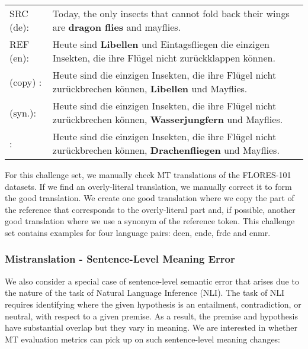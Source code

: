 \documentclass[11pt]{article}
\newcommand{\cmark}{\textcolor{darkpastelgreen}{\ding{51}}}\newcommand{\xmark}{\textcolor{darkpastelred}{\ding{55}}}
\begin{document}
\begin{small}
\vspace{0.5cm}
\setlength{\extrarowheight}{0.1cm}
\begin{tabularx}{0.95\columnwidth}{lX}
     SRC (de): & Today, the only insects that cannot fold back their wings are \textbf{dragon flies} and mayflies. \\
     REF (en): & Heute sind \textbf{Libellen} und Eintagsfliegen die einzigen Insekten, die ihre Flügel nicht zurückklappen können. \\
     \cmark{} (copy) : & Heute sind die einzigen Insekten, die ihre Flügel nicht zurückbrechen können, \textbf{Libellen} und Mayflies. \\
     \cmark{} (syn.): & Heute sind die einzigen Insekten, die ihre Flügel nicht zurückbrechen können, \textbf{Wasserjungfern} und Mayflies. \\
     \xmark: & Heute sind die einzigen Insekten, die ihre Flügel nicht zurückbrechen können, \textbf{Drachenfliegen} und Mayflies. \vspace{0.35cm}
\end{tabularx}
\end{small}

For this challenge set, we manually check MT translations of the FLORES-101 datasets. If we find an overly-literal translation, we manually correct it to form the good translation. We create one good translation where we copy the part of the reference that corresponds to the overly-literal part and, if possible, another good translation where we use a synonym of the reference token. This challenge set contains examples for four language pairs: deen, ende, frde and enmr.



\subsubsection{Mistranslation - Sentence-Level Meaning Error}
\label{subsec:lexically-similar}
We also consider a special case of sentence-level semantic error that arises due to the nature of the task of Natural Language Inference (NLI). The task of NLI requires identifying where the given hypothesis is an entailment, contradiction, or neutral, with respect to a given premise. As a result, the premise and hypothesis have substantial overlap but they vary in meaning. We are interested in whether MT evaluation metrics can pick up on such sentence-level meaning changes:
\end{document}
